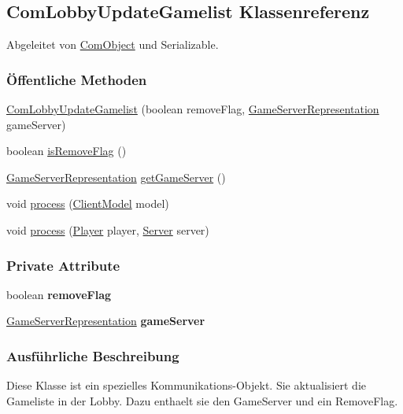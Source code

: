 \hypertarget{a00035}{\subsection{Com\-Lobby\-Update\-Gamelist Klassenreferenz}
\label{a00035}
}


Abgeleitet von \hyperlink{a00037}{Com\-Object} und Serializable.

\subsubsection*{Öffentliche Methoden}
\begin{DoxyCompactItemize}
\item 
\hyperlink{a00035_a23bb741ab4c146ea0f8eb23746d9e28f}{Com\-Lobby\-Update\-Gamelist} (boolean remove\-Flag, \hyperlink{a00073}{Game\-Server\-Representation} game\-Server)
\item 
boolean \hyperlink{a00035_a9dff5523222ad77b87dac521beceadd3}{is\-Remove\-Flag} ()
\item 
\hyperlink{a00073}{Game\-Server\-Representation} \hyperlink{a00035_aaef399d0f2297f4aebba7a7210243973}{get\-Game\-Server} ()
\item 
void \hyperlink{a00035_a758d7005755a181717f238f714d87dd2}{process} (\hyperlink{a00003}{Client\-Model} model)
\item 
void \hyperlink{a00035_ac67b5ce3ec03d48ef1e6caad6e49c902}{process} (\hyperlink{a00076}{Player} player, \hyperlink{a00077}{Server} server)
\end{DoxyCompactItemize}
\subsubsection*{Private Attribute}
\begin{DoxyCompactItemize}
\item 
\hypertarget{a00035_a6a8036d75616cc037b0cf641819947e9}{boolean {\bfseries remove\-Flag}}\label{a00035_a6a8036d75616cc037b0cf641819947e9}

\item 
\hypertarget{a00035_a19947984d075500f41c6335d070b8c21}{\hyperlink{a00073}{Game\-Server\-Representation} {\bfseries game\-Server}}\label{a00035_a19947984d075500f41c6335d070b8c21}

\end{DoxyCompactItemize}


\subsubsection{Ausführliche Beschreibung}
Diese Klasse ist ein spezielles Kommunikations-\/\-Objekt. Sie aktualisiert die Gameliste in der Lobby. Dazu enthaelt sie den Game\-Server und ein Remove\-Flag. 

